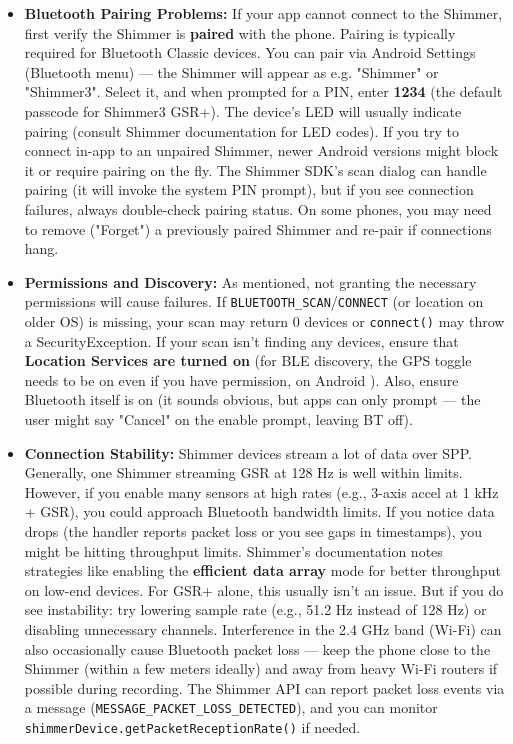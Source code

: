 \begin{itemize}
\item \textbf{Bluetooth Pairing Problems:} If your app cannot connect to the
  Shimmer, first verify the Shimmer is \textbf{paired} with the phone.
  Pairing is typically required for Bluetooth Classic devices. You can
  pair via Android Settings (Bluetooth menu) --- the Shimmer will appear
  as e.g. "Shimmer" or "Shimmer3". Select it, and when prompted for a
  PIN, enter \textbf{1234} (the default passcode for Shimmer3
  GSR+)\cite{ElectrodermalActivityWiki}.
  The device's LED will usually indicate pairing (consult Shimmer
  documentation for LED codes). If you try to connect in-app to an
  unpaired Shimmer, newer Android versions might block it or require
  pairing on the fly. The Shimmer SDK's scan dialog can handle pairing
  (it will invoke the system PIN prompt), but if you see connection
  failures, always double-check pairing status. On some phones, you may
  need to remove ("Forget") a previously paired Shimmer and re-pair if
  connections hang.

\item \textbf{Permissions and Discovery:} As mentioned, not granting the
  necessary permissions will cause failures. If
  \texttt{BLUETOOTH_SCAN}/\texttt{CONNECT} (or location on older OS) is missing, your
  scan may return 0 devices or \texttt{connect()} may throw a
  SecurityException. If your scan isn't finding any devices, ensure that
  \textbf{Location Services are turned on} (for BLE discovery, the GPS toggle
  needs to be on even if you have permission, on Android ). Also,
  ensure Bluetooth itself is on (it sounds obvious, but apps can only
  prompt --- the user might say "Cancel" on the enable prompt, leaving BT
  off).

\item \textbf{Connection Stability:} Shimmer devices stream a lot of data over
  SPP. Generally, one Shimmer streaming GSR at 128 Hz is well within
  limits. However, if you enable many sensors at high rates (e.g.,
  3-axis accel at 1 kHz + GSR), you could approach Bluetooth bandwidth
  limits. If you notice data drops (the handler reports packet loss or
  you see gaps in timestamps), you might be hitting throughput limits.
  Shimmer's documentation notes strategies like enabling the \textbf{efficient
  data array} mode for better throughput on low-end
  devices\cite{DeviceServer}.
  For GSR+ alone, this usually isn't an issue. But if you do see
  instability: try lowering sample rate (e.g., 51.2 Hz instead of 128
  Hz) or disabling unnecessary channels. Interference in the 2.4 GHz
  band (Wi-Fi) can also occasionally cause Bluetooth packet loss --- keep
  the phone close to the Shimmer (within a few meters ideally) and away
  from heavy Wi-Fi routers if possible during recording. The Shimmer API
  can report packet loss events via a message
  (\texttt{MESSAGE_PACKET_LOSS_DETECTED}), and you can monitor
  \texttt{shimmerDevice.getPacketReceptionRate()} if needed.


\end{itemize}
